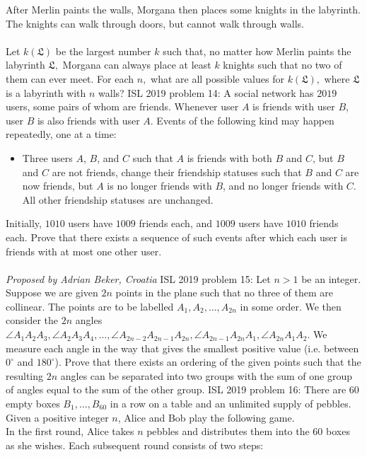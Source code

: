 After Merlin paints the walls, Morgana then places some knights in the labyrinth. The knights can walk through doors, but cannot walk through walls. \\\\
Let $k(\mathfrak{L})$ be the largest number $k$ such that, no matter how Merlin paints the labyrinth $\mathfrak{L},$ Morgana can always place at least $k$ knights such that no two of them can ever meet. For each $n,$ what are all possible values for $k(\mathfrak{L}),$ where $\mathfrak{L}$ is a labyrinth with $n$ walls? 
ISL 2019 problem 14:  A social network has $2019$ users, some pairs of whom are friends. Whenever user $A$ is friends with user $B$, user $B$ is also friends with user $A$. Events of the following kind may happen repeatedly, one at a time:
\begin{itemize}
  \item Three users $A$, $B$, and $C$ such that $A$ is friends with both $B$ and $C$, but $B$ and $C$ are not friends, change their friendship statuses such that $B$ and $C$ are now friends, but $A$ is no longer friends with $B$, and no longer friends with $C$. All other friendship statuses are unchanged.
\end{itemize}
Initially, $1010$ users have $1009$ friends each, and $1009$ users have $1010$ friends each. Prove that there exists a sequence of such events after which each user is friends with at most one other user. \\\\
\textit{Proposed by Adrian Beker, Croatia} 
ISL 2019 problem 15:  Let $n>1$ be an integer. Suppose we are given $2n$ points in the plane such that no three of them are collinear. The points are to be labelled $A_1, A_2, \dots , A_{2n}$ in some order. We then consider the $2n$ angles $\angle A_1A_2A_3, \angle A_2A_3A_4, \dots , \angle A_{2n-2}A_{2n-1}A_{2n}, \angle A_{2n-1}A_{2n}A_1, \angle A_{2n}A_1A_2$. We measure each angle in the way that gives the smallest positive value (i.e. between $0^{\circ}$ and $180^{\circ}$). Prove that there exists an ordering of the given points such that the resulting $2n$ angles can be separated into two groups with the sum of one group of angles equal to the sum of the other group. 
ISL 2019 problem 16:  There are 60 empty boxes $B_1,\ldots,B_{60}$ in a row on a table and an unlimited supply of pebbles. Given a positive integer $n$, Alice and Bob play the following game. \\
In the first round, Alice takes $n$ pebbles and distributes them into the 60 boxes as she wishes. Each subsequent round consists of two steps:
